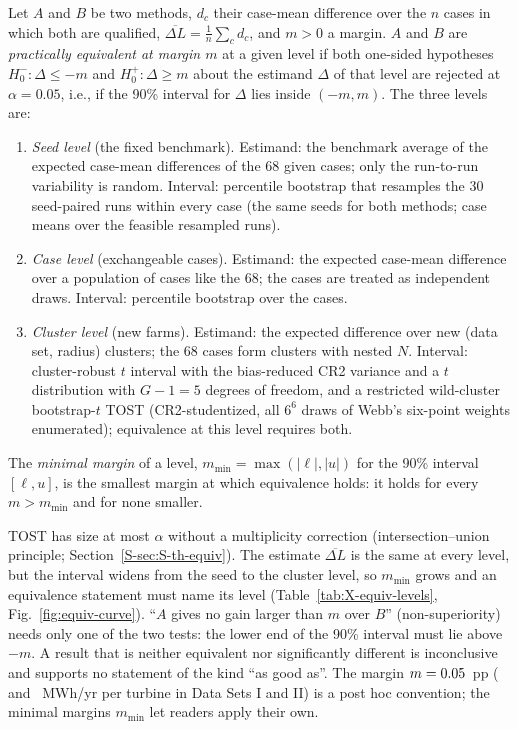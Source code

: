 \begin{definition}
\label{def:S-equiv}
Let $A$ and $B$ be two methods, $d_c$ their case-mean difference over the $n$ cases in which both are qualified, $\overline{\Delta L}=\frac1n\sum_c d_c$, and $m>0$ a margin. $A$ and $B$ are \emph{practically equivalent at margin $m$} at a given level if both one-sided hypotheses $H_0^-\colon\Delta\le-m$ and $H_0^+\colon\Delta\ge m$ about the estimand $\Delta$ of that level are rejected at $\alpha=0.05$, i.e., if the 90\% interval for $\Delta$ lies inside $(-m,m)$. The three levels are:
\begin{enumerate}
\item[(a)] \emph{Seed level} (the fixed benchmark). Estimand: the benchmark average of the expected case-mean differences of the 68 given cases; only the run-to-run variability is random. Interval: percentile bootstrap that resamples the 30 seed-paired runs within every case (the same seeds for both methods; case means over the feasible resampled runs).
\item[(b)] \emph{Case level} (exchangeable cases). Estimand: the expected case-mean difference over a population of cases like the 68; the cases are treated as independent draws. Interval: percentile bootstrap over the cases.
\item[(c)] \emph{Cluster level} (new farms). Estimand: the expected difference over new (data set, radius) clusters; the 68 cases form \NXClusters{} clusters with nested $N$. Interval: cluster-robust $t$ interval with the bias-reduced CR2 variance and a $t$ distribution with $G-1=5$ degrees of freedom, and a restricted wild-cluster bootstrap-$t$ TOST (CR2-studentized, all $6^6$ draws of Webb's six-point weights enumerated); equivalence at this level requires both.
\end{enumerate}
The \emph{minimal margin} of a level, $m_{\min}=\max(\lvert\ell\rvert,\lvert u\rvert)$ for the 90\% interval $[\ell,u]$, is the smallest margin at which equivalence holds: it holds for every $m>m_{\min}$ and for none smaller.
\end{definition}
TOST has size at most $\alpha$ without a multiplicity correction (intersection--union principle; Section~\ref{S-sec:S-th-equiv}). The estimate $\overline{\Delta L}$ is the same at every level, but the interval widens from the seed to the cluster level, so $m_{\min}$ grows and an equivalence statement must name its level (Table~\ref{tab:X-equiv-levels}, Fig.~\ref{fig:equiv-curve}). ``$A$ gives no gain larger than $m$ over $B$'' (non-superiority) needs only one of the two tests: the lower end of the 90\% interval must lie above $-m$. A result that is neither equivalent nor significantly different is inconclusive and supports no statement of the kind ``as good as''. The margin $m=0.05$~pp (\NXMarginMWhTurbDsI{} and \NXMarginMWhTurbDsII~MWh/yr per turbine in Data Sets I and II) is a post hoc convention; the minimal margins $m_{\min}$ let readers apply their own.

